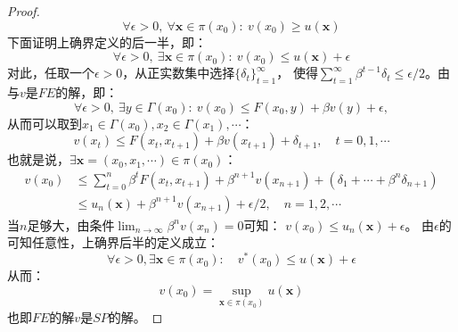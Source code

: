 \begin{proof}
\begin{equation*}
        \forall \epsilon > 0, ~\forall \boldsymbol{x}\in \pi\left(x_0\right): 
            ~ v\left(x_0\right)\geq u\left(\boldsymbol{x}\right)
    \end{equation*}
    下面证明上确界定义的后一半，即：
    \begin{equation*}
        \forall \epsilon > 0, ~\exists \boldsymbol{x}\in\pi\left(x_0\right): 
            ~ v\left(x_0\right)\leq u\left(\boldsymbol{x}\right)+\epsilon  
    \end{equation*}
    对此，任取一个$\epsilon>0$，从正实数集中选择$\{\delta_t\}_{t=1}^{\infty}$，
    使得$\sum_{t=1}^{\infty}\beta^{t-1}\delta_t\leq \epsilon /2$。由与$v$是$FE$的解，即：
    \begin{equation*}
        \forall \epsilon > 0, ~\exists y\in \Gamma\left(x_0\right): 
            ~v\left(x_0\right)\leq F\left(x_0,y\right) + \beta v\left(y\right) + \epsilon, 
    \end{equation*}
    从而可以取到$x_1\in\Gamma\left(x_0\right), x_2\in\Gamma\left(x_1\right),\cdots$：
    \begin{equation*}
        v\left(x_t\right)\leq 
            F\left(x_t,x_{t+1}\right)+\beta v\left(x_{t+1}\right)+\delta_{t+1},\quad t=0,1,\cdots
    \end{equation*}
    也就是说，$\exists\boldsymbol{x}=\left(x_0,x_1,\cdots\right)\in \pi\left(x_0\right)$：
    \begin{equation*}
        \begin{aligned}
            v\left(x_0\right) &\leq \sum_{t=0}^{n}\beta^t F\left(x_t,x_{t+1}\right) + 
                \beta^{n+1}v\left(x_{n+1}\right) + \left(\delta_1+\cdots+\beta^n \delta_{n+1}\right)   \\
            &\leq u_n\left(\boldsymbol{x}\right)+\beta^{n+1}v\left(x_{n+1}\right)+\epsilon/2, \quad n=1,2,\cdots
        \end{aligned}
    \end{equation*}
    当$n$足够大，由条件$\lim_{n\rightarrow \infty}\beta^n v\left(x_n\right)=0$可知：
    $v\left(x_0\right)\leq u_n\left(\boldsymbol{x}\right)+\epsilon$。
    由$\epsilon$的可知任意性，上确界后半的定义成立：
    \begin{equation*}
        \forall \epsilon > 0, \exists \boldsymbol{x}\in\pi\left(x_0\right): 
            \quad v^*\left(x_0\right)\leq u\left(\boldsymbol{x}\right)+\epsilon
    \end{equation*}
    从而：
    \begin{equation*}
        v\left(x_0\right)=\sup _{\boldsymbol{x}\in\pi\left(x_0\right)} u\left(\boldsymbol{x}\right)
    \end{equation*}
    也即$FE$的解$v$是$SP$的解。
\end{proof}

